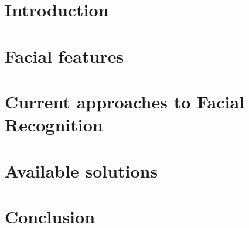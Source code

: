 
\chapter{Introduction}
\label{chapter:introduction}


\chapter{Facial features}
\label{chapter:features}


\chapter{Current approaches to Facial Recognition}
\label{chapter:research}


\chapter{Available solutions}
\label{chapter:solutions}



\chapter{Conclusion}
\label{chapter:conclusion}
\listoftodos

